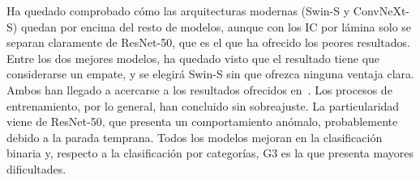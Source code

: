 Ha quedado comprobado cómo las arquitecturas modernas (Swin-S y ConvNeXt-S) quedan por encima del resto de modelos, aunque con los IC por lámina solo se separan claramente de ResNet-50, que es el que ha ofrecido los peores resultados. Entre los dos mejores modelos, ha quedado visto que el resultado tiene que considerarse un empate, y se elegirá Swin-S sin que ofrezca ninguna ventaja clara. Ambos han llegado a acercarse a los resultados ofrecidos en~\cite{ayensa2026}. Los procesos de entrenamiento, por lo general, han concluido sin sobreajuste. La particularidad viene de ResNet-50, que presenta un comportamiento anómalo, probablemente debido a la parada temprana. Todos los modelos mejoran en la clasificación binaria y, respecto a la clasificación por categorías, G3 es la que presenta mayores dificultades.

\endinput
